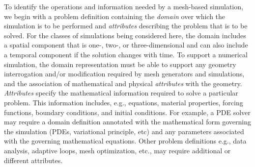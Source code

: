 


To identify the operations and information needed by a mesh-based
simulation, we begin with a problem definition containing the {\it
domain} over which the simulation is to be performed and {\it
attributes} describing the problem that is to be solved.  For the
classes of simulations being considered here, the domain includes a
spatial component that is one-, two-, or three-dimensional and can
also include a temporal component if the solution changes with time.
To support a numerical simulation, the domain representation must be
able to support any geometry interrogation and/or modification
required by mesh generators and simulations, and the association of
mathematical and physical {\it attributes} with the geometry.  {\it
Attributes} specify the mathematical information required to solve a
particular problem.  This information includes, e.g., equations,
material properties, forcing functions, boundary conditions, and
initial conditions.  For example, a PDE solver may require a domain
definition annotated with the mathematical form governing the
simulation (PDEs, variational principle, etc) and any parameters
associated with the governing mathematical equations.  Other problem
definitions e.g., data analysis, adaptive loops, mesh optimization,
etc., may require additional or different attributes.

